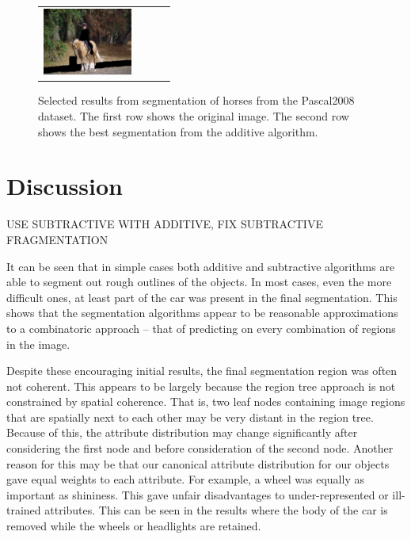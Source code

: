 \documentclass[10pt,twocolumn,letterpaper]{article}
\begin{document}
\begin{figure}[p]
\begin{tabular}{ p{3cm} p{3cm} p{3cm} p{3cm} }
\includegraphics[width=2.95cm]{figures/add_res/horse/2008_004470.jpg_3_bad.jpg.eps} \\
\end{tabular}
\caption{Selected results from segmentation of horses from the Pascal2008
dataset.  The first row shows the original image.  The second row shows
the best segmentation from the additive algorithm.}
\label{fig:horse_bad_results}
\end{figure}


\section{Discussion}
\label{sec:discussion}

USE SUBTRACTIVE WITH ADDITIVE, FIX SUBTRACTIVE FRAGMENTATION


It can be seen that in simple cases both additive and subtractive algorithms
are able to segment out rough outlines of the objects.  In most cases, even
the more difficult ones, at least part of the car was present in the final
segmentation.  This shows that the segmentation algorithms appear to be
reasonable approximations to a combinatoric approach -- that of predicting
on every combination of regions in the image.

Despite these encouraging initial results, the final segmentation region
was often not coherent.
This appears to be largely because the region tree approach is not
constrained by spatial coherence.  That is, two leaf nodes containing image
regions that are spatially next to each other may be very distant in the
region tree.  Because of this, the attribute distribution may change significantly
after considering the first node and before consideration of the second node.
Another reason for this may be that our canonical attribute distribution for
our objects gave equal weights to each attribute.  For example, a wheel was
equally as important as shininess.  This gave unfair disadvantages to
under-represented or ill-trained attributes.  This can be seen in the results
where the body of the car is removed while the wheels or headlights are
retained.
\end{document}
